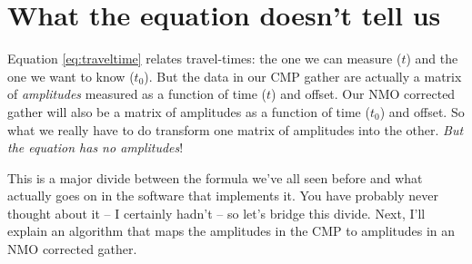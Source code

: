 \section{What the equation doesn't tell us}

Equation \ref{eq:traveltime} relates travel-times: the one we can measure ($t$)
and the one we want to know ($t_0$).
But the data in our CMP gather are actually a matrix of \textit{amplitudes}
measured as a function of time ($t$) and offset.
Our NMO corrected gather will also be a matrix of amplitudes as a function of
time ($t_0$) and offset.
So what we really have to do transform one matrix of amplitudes into the other.
\textit{But the equation has no amplitudes}!

This is a major divide between the formula we've all seen before and what
actually goes on in the software that implements it.
You have probably never thought about it -- I certainly hadn't --
so let's bridge this divide.
Next, I'll explain an algorithm that maps the amplitudes in the CMP to
amplitudes in an NMO corrected gather.

